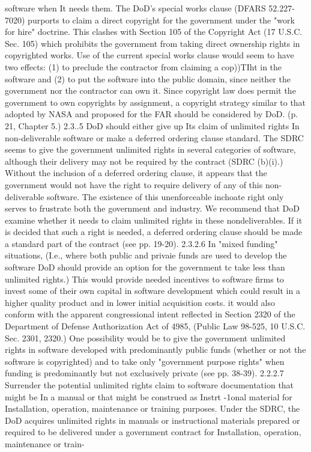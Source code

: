 \documentclass[12pt]{article}
\begin{document}
software when It needs them.
The DoD's special works clause (DFARS 52.227-7020) purports to claim a direct copyright for the
government under the "work for hire" doctrine. This clashes with Section 105 of the Copyright Act (17
U.S.C. Sec. 105) which prohibits the government from taking direct ownership rights in copyrighted
works. Use of the current special works clause would seem to have two effects: (1) to preclude the
contractor from claiming a cop))TIht in the software and (2) to put the software into the public domain,
since neither the government nor the contractor can own it.
Since copyright law does permit the government to own copyrights by assignment, a copyright strategy similar to that adopted by NASA and proposed for the FAR should be considered by DoD. (p. 21,
Chapter 5.)
2.3..5 DoD should either give up Its claim of unlimited rights In non-deliverable software or
make a deferred ordering clause standard.
The SDRC seems to give the government unlimited rights in several categories of software, although
their delivery may not be required by the contract (SDRC (b)(i).) Without the inclusion of a deferred
ordering clause, it appears that the government would not have the right to require delivery of any of
this non-deliverable software. The existence of this unenforceable inchoate right only serves to
frustrate both the government and industry.
We recommend that DoD examine whether it needs to claim unlimited rights in these nondeliverables. If it is decided that such a right is needed, a deferred ordering clause should be made a
standard part of the contract (see pp. 19-20).
2.3.2.6 In "mixed funding" situations, (I.e., where both public and privaie funds are used to
develop the software DoD should provide an option for the government tc take less than unlimited
rights.)
This would provide needed incentives to software firms to invest some of their own capital in software
development which could result in a higher quality product and in lower initial acquisition costs. it
would also conform with the apparent congressional intent reflected in Section 2320 of the Department of Defense Authorization Act of 4985, (Public Law 98-525, 10 U.S.C. Sec. 2301, 2320.)
One possibility would be to give the government unlimited rights in software developed with
predominantly public funds (whether or not the software is copyrighted) and to take only "government
purpose rights" when funding is predominantly but not exclusively private (see pp. 38-39).
2.2.2.7 Surrender the potential unlimited rights claim to software documentation that might
be In a manual or that might be construed as Instrt -1onal material for Installation, operation,
maintenance or training purposes.
Under the SDRC, the DoD acquires unlimited rights in manuals or instructional materials prepared or
required to be delivered under a government contract for Installation, operation, maintenance or train-
\end{document}
